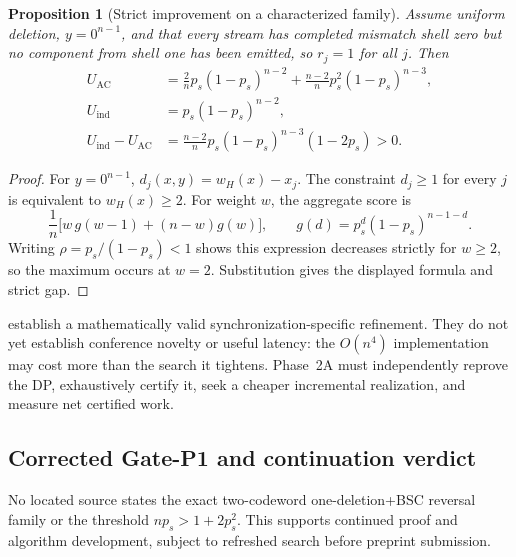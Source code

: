 \documentclass[11pt]{article}
\newtheorem{proposition}[theorem]{Proposition}
\theoremstyle{definition}
\theoremstyle{remark}
\begin{document}
\begin{proposition}[Strict improvement on a characterized family]
\label{prop:ac-strict}
Assume uniform deletion, $y=0^{n-1}$, and that every stream has completed mismatch shell zero but no component from shell one has been emitted, so $r_j=1$ for all $j$. Then
\begin{align*}
 U_{\mathrm{AC}}
 &=\frac{2}{n}p_s(1-p_s)^{n-2}
   +\frac{n-2}{n}p_s^2(1-p_s)^{n-3},\\
 U_{\mathrm{ind}}
 &=p_s(1-p_s)^{n-2},\\
 U_{\mathrm{ind}}-U_{\mathrm{AC}}
 &=\frac{n-2}{n}p_s(1-p_s)^{n-3}(1-2p_s)>0.
\end{align*}
\end{proposition}

\begin{proof}
For $y=0^{n-1}$, $d_j(x,y)=w_H(x)-x_j$. The constraint $d_j\ge1$ for every $j$ is equivalent to $w_H(x)\ge2$. For weight $w$, the aggregate score is
\[
 \frac1n\bigl[w\,g(w-1)+(n-w)g(w)\bigr],
 \qquad g(d)=p_s^d(1-p_s)^{n-1-d}.
\]
Writing $\rho=p_s/(1-p_s)<1$ shows this expression decreases strictly for $w\ge2$, so the maximum occurs at $w=2$. Substitution gives the displayed formula and strict gap.
\end{proof}

\begin{riskbox}
 establish a mathematically valid synchronization-specific refinement. They do not yet establish conference novelty or useful latency: the $O(n^4)$ implementation may cost more than the search it tightens. Phase~2A must independently reprove the DP, exhaustively certify it, seek a cheaper incremental realization, and measure net certified work.
\end{riskbox}

\subsection{Corrected Gate-P1 and continuation verdict}

\begin{gatebox}
No located source states the exact two-codeword one-deletion+BSC reversal family or the threshold $np_s>1+2p_s^2$. This supports continued proof and algorithm development, subject to refreshed search before preprint submission.
\end{gatebox}
\end{document}
